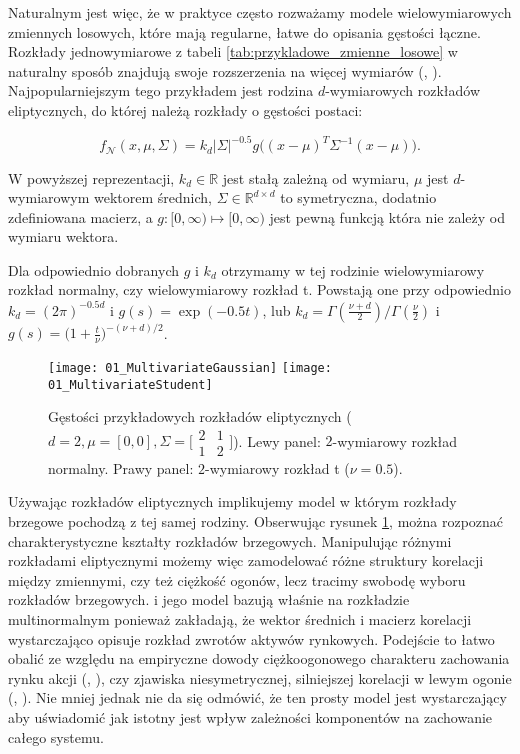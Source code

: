 Naturalnym jest więc, że w praktyce często rozważamy modele wielowymiarowych zmiennych losowych, które mają regularne, łatwe do opisania gęstości łączne. Rozkłady jednowymiarowe z tabeli \ref{tab:przykladowe_zmienne_losowe} w naturalny sposób znajdują swoje rozszerzenia na więcej wymiarów (\cite{MultivariateDistributions}, \cite{Cherubini_Copula_Methods_in_Finance}). Najpopularniejszym tego przykładem jest rodzina $d$-wymiarowych rozkładów eliptycznych, do której należą rozkłady o gęstości postaci:

$$ f_{\mathcal{N}}(x, \mu, \Sigma) = k_d \vert\Sigma\vert^{-0.5}g\big((x-\mu)^T\Sigma^{-1}(x-\mu)\big).$$

W powyższej reprezentacji, $k_d \in\mathbb{R}$ jest stałą zależną od wymiaru, $\mu$ jest $d$-wymiarowym wektorem średnich, $\Sigma \in \mathbb{R}^{d \times d}$ to symetryczna, dodatnio zdefiniowana macierz, a $g \colon [0, \infty) \mapsto [0, \infty)$ jest pewną funkcją która nie zależy od wymiaru wektora.

Dla odpowiednio dobranych $g$ i $k_d$ otrzymamy w tej rodzinie wielowymiarowy rozkład normalny, czy wielowymiarowy rozkład t. Powstają one przy odpowiednio $k_d=(2\pi)^{-0.5d}$ i $g(s) = \exp(-0.5 t)$, lub $k_d=\Gamma(\frac{\nu + d}{2})/\Gamma(\frac{\nu}{2})$ i $g(s) = \big(1 + \frac{t}{\nu})^{-(\nu + d)/2}$.
\begin{figure}[H]
	\centering
	\texttt{[image: 01\_MultivariateGaussian]}	\texttt{[image: 01\_MultivariateStudent]}
	\caption{Gęstości przykładowych rozkładów eliptycznych ($d=2, \mu=[0, 0], \Sigma = \big[\begin{smallmatrix}2&1\\1&2\end{smallmatrix}\big]$). Lewy panel: $2$-wymiarowy rozkład normalny. Prawy panel: $2$-wymiarowy rozkład t ($\nu = 0.5$).\label{fig:multivariate_gaussian_student}}
\end{figure}

Używając rozkładów eliptycznych implikujemy model w którym rozkłady brzegowe pochodzą z tej samej rodziny. Obserwując rysunek \ref{fig:multivariate_gaussian_student}, można rozpoznać charakterystyczne kształty rozkładów brzegowych. Manipulując różnymi rozkładami eliptycznymi możemy więc zamodelować różne struktury korelacji między zmiennymi, czy też ciężkość ogonów, lecz tracimy swobodę wyboru rozkładów brzegowych. \cite{Markovitz_MPT} i jego model bazują właśnie na rozkładzie multinormalnym ponieważ zakładają, że wektor średnich i macierz korelacji wystarczająco opisuje rozkład zwrotów aktywów rynkowych. Podejście to łatwo obalić ze względu na empiryczne dowody ciężkoogonowego charakteru zachowania rynku akcji (\cite{Taleb_BS_is_BS}, \cite{Mandelbrot_NonGaussianity}), czy zjawiska niesymetrycznej, silniejszej korelacji w lewym ogonie (\cite{Taleb_BS_is_BS}, \cite{AssymetricEquityDependency}). Nie mniej jednak nie da się odmówić, że ten prosty model jest wystarczający aby uświadomić jak istotny jest wpływ zależności komponentów na zachowanie całego systemu.\\
